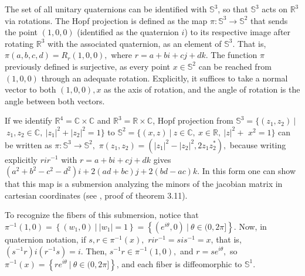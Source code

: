\documentclass[12pt, letterpaper, reqno]{amsart}
\theoremstyle{definition}
\theoremstyle{plain}
\theoremstyle{remark}
\begin{document}
The set of all unitary quaternions can be identified with $ \mathbb{S}^3 $, so that $ \mathbb{S}^3 $ acts on $ \mathbb{R}^3 $ via rotations. The Hopf projection is defined as the map $ \pi: \mathbb{S}^3 \rightarrow \mathbb{S}^2 $ that sends the point $ (1,0,0) $ (identified as the quaternion $ i $)   to its respective image after rotating $ \mathbb{R}^3 $ with the associated quaternion, as an element of $ \mathbb{S}^3 $. That is, $ \pi(a,b,c,d) = R_r(1,0,0), $ where $ r=a+bi+cj+dk. $  The function $ \pi $ previously defined is surjective, as every point $ x\in\mathbb{S}^2 $ can be reached from $ (1,0,0) $ through an adequate rotation. Explicitly, it suffices to take a normal vector to both $ (1,0,0), x $ as the axis of rotation, and the angle of rotation is the angle between both vectors. 

	If we identify $ \mathbb{R}^4=\mathbb{C}\times \mathbb{C} $ and $ \mathbb{R}^3= \mathbb{R}\times\mathbb{C}  $, Hopf projection from $ \mathbb{S}^3= \{ (z_1,z_2)\  |$ $ \ z_1,z_2\in \mathbb{C}, \ |z_1|^2+|z_2|^2=1 \} $ to $ \mathbb{S}^2 = \{ (x,z)\ | \ z\in \mathbb{C},\ x\in \mathbb{R},\ |z|^2+$ $x^2=1 \} $  can be written as $ \pi: \mathbb{S}^3 \rightarrow { \mathbb{S}^2},$ $ \pi(z_1,z_2) =(|z_1|^2-|z_2|^2, 2z_1z_2^* ),$ because writing explicitly $ rir^{-1} $ with $ r=a+bi+cj+dk $ gives $ (a^2+b^2-c^2-d^2)i+2(ad+bc)j+2(bd-ac)k. $    In this form one can show that this map is a submersion analyzing the minors of the jacobian matrix in cartesian coordinates (see \cite{linintroductory}, proof of theorem 3.11).

	To recognize the fibers of this submersion, notice that $ \pi^{-1}(1,0) = \left\{ (w_1,0) \ | \ |w_1| =1 \right\} = \left\{ (e^{i\theta},0) \ | \ \theta\in (0,2\pi]  \right\} $. Now, in quaternion notation, if $ s,r\in \pi^{-1}(x), $ $ rir^{-1} = sis^{-1}=x $, that is, $ (s^{-1}r)i(r^{-1}s) = i $. Then, $ s^{-1}r \in \pi^{-1}(1,0), $ and $ r= se^{i\theta}, $ so $ \pi^{-1}(x) = \left\{ re^{i\theta}\ | \ \theta\in (0,2\pi] \right\} $, and each fiber is diffeomorphic to $ \mathbb{S}^1. $        
\end{document}
